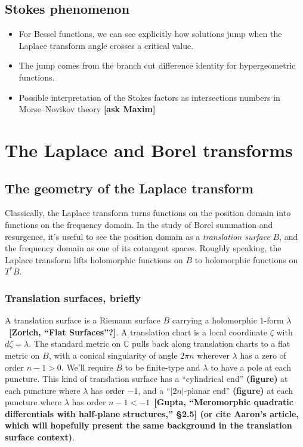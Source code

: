 \documentclass{article}
\theoremstyle{definition}
\newcommand{\C}{\mathbb{C}}
\begin{document}
\subsection{Stokes phenomenon}
\begin{itemize}
\item For Bessel functions, we can see explicitly how solutions jump when the Laplace transform angle crosses a critical value.
\item The jump comes from the branch cut difference identity for hypergeometric functions.
\item Possible interpretation of the Stokes factors as intersections numbers in Morse--Novikov theory \textbf{[ask Maxim]}
\end{itemize}
\section{The Laplace and Borel transforms}\label{sec:Laplace-Borel-general}
\subsection{The geometry of the Laplace transform}

Classically, the Laplace transform turns functions on the position domain into functions on the frequency domain. In the study of Borel summation and resurgence, it's useful to see the position domain as a {\em translation surface} $B$, and the frequency domain as one of its cotangent spaces. Roughly speaking, the Laplace transform lifts holomorphic functions on $B$ to holomorphic functions on $T^* B$.
\subsubsection{Translation surfaces, briefly}

A translation surface is a Riemann surface $B$ carrying a holomorphic $1$-form $\lambda$~\textbf{[Zorich, ``Flat Surfaces''?]}. A translation chart is a local coordinate $\zeta$ with $d\zeta = \lambda$. The standard metric on $\C$ pulls back along translation charts to a flat metric on $B$, with a conical singularity of angle $2\pi n$ wherever $\lambda$ has a zero of order $n-1 > 0$. We'll require $B$ to be finite-type and $\lambda$ to have a pole at each puncture. This kind of translation surface has a ``cylindrical end'' \textbf{(figure)} at each puncture where $\lambda$ has order $-1$, and a ``$|2n|$-planar end'' \textbf{(figure)} at each puncture where $\lambda$ has order $n-1 < -1$~\textbf{[Gupta, ``Meromorphic quadratic differentials with half-plane structures,'' \S 2.5] (or cite Aaron's article, which will hopefully present the same background in the translation surface context)}.
\end{document}
